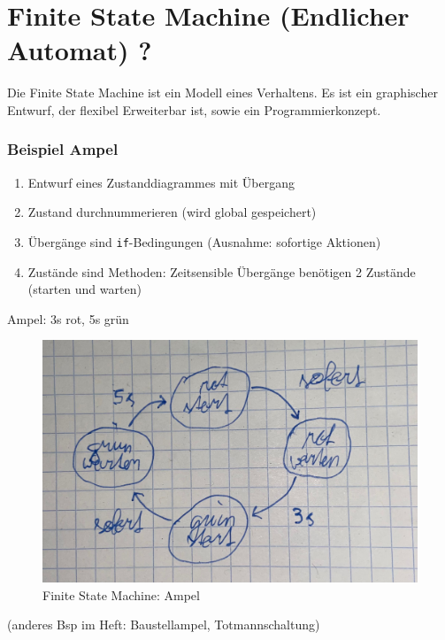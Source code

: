 \chapter{Finite State Machine (Endlicher Automat) ?}
Die Finite State Machine ist ein Modell eines Verhaltens. Es ist ein graphischer Entwurf, der flexibel Erweiterbar ist, sowie ein Programmierkonzept.

\subsection*{Beispiel Ampel}
\begin{enumerate}
	\item Entwurf eines Zustanddiagrammes mit Übergang
	\item Zustand durchnummerieren (wird global gespeichert)
	\item Übergänge sind \texttt{if}-Bedingungen (Ausnahme: sofortige Aktionen)
	\item Zustände sind Methoden: Zeitsensible Übergänge benötigen 2 Zustände (starten und warten)
\end{enumerate}
Ampel: 3s rot, 5s grün
\begin{figure}[H]
	\centering
	\includegraphics[width=0.8\linewidth]{figures/ampel.jpeg}
	\caption{Finite State Machine: Ampel}
\end{figure}

(anderes Bsp im Heft: Baustellampel, Totmannschaltung)